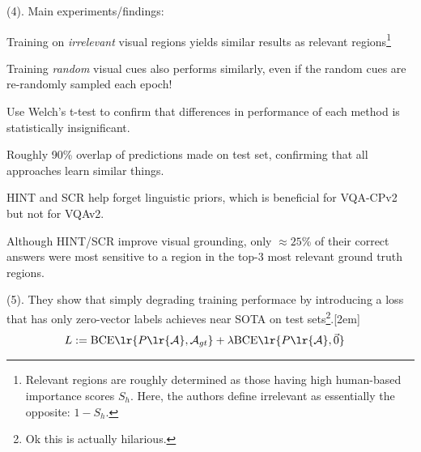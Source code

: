 \documentclass[11pt]{article}
\begin{document}
 (4). Main experiments/findings:
\begin{compactitem}
	\item Training on \textit{irrelevant} visual regions yields similar results as relevant regions\footnote{Relevant regions are roughly determined as those having high human-based importance scores $S_h$. Here, the authors define irrelevant as essentially the opposite: $1-S_h$.}
	
	\item Training \textit{random} visual cues also performs similarly, even if the random cues are re-randomly sampled each epoch!
	
	\item Use Welch's t-test to confirm that differences in performance of each method is statistically insignificant.
	
	\item Roughly 90\%\textit{} overlap of predictions made on test set, confirming that all approaches learn similar things.
	
	\item HINT and SCR help forget linguistic priors, which is beneficial for VQA-CPv2 but not for VQAv2.
	
	\item Although HINT/SCR improve visual grounding, only $\approx 25$\% of their correct answers were most sensitive to a region in the top-3 most relevant ground truth regions.
\end{compactitem}


 (5). They show that simply degrading training performace by introducing a loss that has only zero-vector labels achieves near SOTA on test sets\footnote{Ok this is actually hilarious.}.[2em]
\begin{align}
	L &:= \text{BCE}\lr{ P\lr{\mathcal A}, \mathcal{A}_{gt} } + \lambda \text{BCE}\lr{  P\lr{\mathcal A}, \vec 0 }
\end{align}







\end{document}
